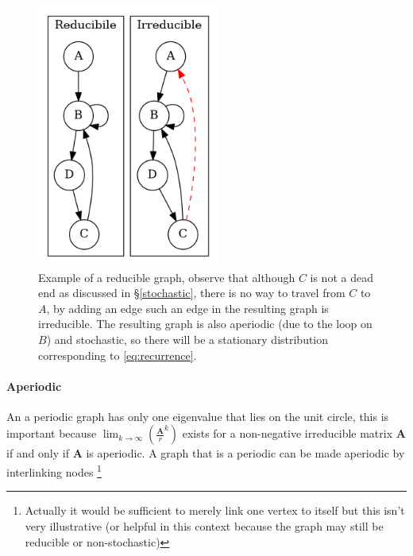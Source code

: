 \documentclass[11pt]{article}
\begin{document}
\begin{figure}[htbp]
\centering
\includegraphics[width=6cm]{media/dot/reducible_graph_example.dot.png}
\caption{\label{irreducible-example}Example of a reducible graph, observe that although \(C\) is not a dead end as discussed in \S \ref{stochastic}, there is no way to travel from \(C\) to \(A\), by adding an edge such an edge in the resulting graph is irreducible. The resulting graph is also aperiodic (due to the loop on \(B\)) and stochastic, so there will be a stationary distribution corresponding to \eqref{eq:recurrence}.}
\end{figure}

\paragraph{Aperiodic}
\label{sec:orgb5b3f90}
An a periodic graph has only one eigenvalue that lies on the unit circle, this is important because \(\lim_{k\rightarrow \infty} \left( \frac{\mathbf{A}}{r}^{k} \right)\) exists for a non-negative irreducible matrix \(\mathbf{A}\) if and only if \(\mathbf{A}\) is aperiodic. A graph that is a periodic can be made aperiodic by interlinking nodes \footnote{Actually it would be sufficient to merely link one vertex to itself \cite[]{langvilleGooglePageRankScience2012} but this isn't very illustrative (or helpful in this context because the graph may still be reducible or non-stochastic)}
\end{document}
